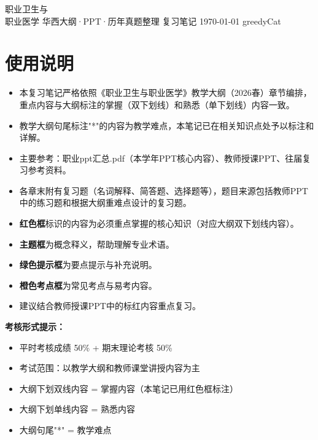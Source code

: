 \documentclass[10pt,a4paper,oneside]{ctexbook}
\begin{document}
\makecover
  {职业卫生与\\职业医学}       
  {华西大纲·PPT·历年真题整理}    
  {复习笔记}                  
  {\today}                 
  {greedyCat}                  

\tableofcontents

\chapter*{使用说明}

\begin{itemize}[leftmargin=*]
    \item 本复习笔记严格依照《职业卫生与职业医学》教学大纲（2026春）章节编排，重点内容与大纲标注的掌握（双下划线）和熟悉（单下划线）内容一致。
    \item 教学大纲句尾标注"*"的内容为教学难点，本笔记已在相关知识点处予以标注和详解。
    \item 主要参考：职业ppt汇总.pdf（本学年PPT核心内容）、教师授课PPT、往届复习参考资料。
    \item 各章末附有复习题（名词解释、简答题、选择题等），题目来源包括教师PPT中的练习题和根据大纲重难点设计的复习题。
    \item \textbf{\color{keyred}红色框}标识的内容为必须重点掌握的核心知识（对应大纲双下划线内容）。
    \item \textbf{\color{main}主题框}为概念释义，帮助理解专业术语。
    \item \textbf{\color{darkgreen}绿色提示框}为要点提示与补充说明。
    \item \textbf{\color{orange}橙色考点框}为常见考点与易考内容。
    \item 建议结合教师授课PPT中的标红内容重点复习。
\end{itemize}

\vspace{1cm}
\begin{center}
\begin{tcolorbox}[colback=yellow!10, colframe=yellow!80!black, boxrule=0.8pt, arc=6pt, width=0.85\textwidth, breakable]
\textbf{考核形式提示：}
\begin{itemize}[leftmargin=*]
    \item 平时考核成绩 50\% + 期末理论考核 50\%
    \item 考试范围：以教学大纲和教师课堂讲授内容为主
    \item 大纲下划双线内容 = 掌握内容（本笔记已用红色框标注）
    \item 大纲下划单线内容 = 熟悉内容
    \item 大纲句尾"*" = 教学难点
\end{itemize}
\end{tcolorbox}
\end{center}
\end{document}
